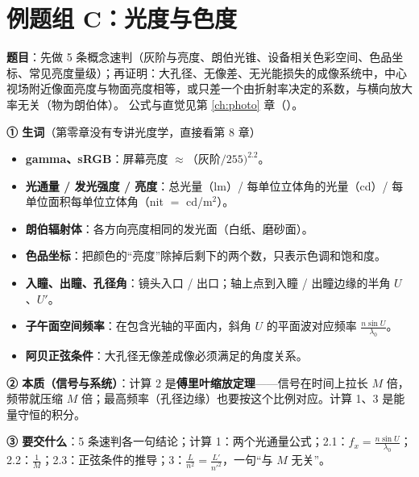 \section{例题组 C：光度与色度}\label{sec:exgC}
\noindent\textbf{题目}：先做 5 条概念速判（灰阶与亮度、朗伯光锥、设备相关色彩空间、色品坐标、常见亮度量级）；再证明：大孔径、无像差、无光能损失的成像系统中，中心视场附近像面亮度与物面亮度相等，或只差一个由折射率决定的系数，与横向放大率无关（物为朗伯体）。
公式与直觉见第 \ref{ch:photo} 章（\pageref{ch:photo}）。

\label{rd:exgC}
\begin{idea}[读题：概念与要交什么]
\textbf{① 生词}（第零章没有专讲光度学，直接看第 8 章）
\begin{itemize}
\item \textbf{gamma、sRGB}：屏幕亮度 $\approx$（灰阶$/255)^{2.2}$。
\item \textbf{光通量 / 发光强度 / 亮度}：总光量（lm）/ 每单位立体角的光量（cd）/ 每单位面积每单位立体角（nit $=$ cd/m$^2$）。
\item \textbf{朗伯辐射体}：各方向亮度相同的发光面（白纸、磨砂面）。
\item \textbf{色品坐标}：把颜色的“亮度”除掉后剩下的两个数，只表示色调和饱和度。
\item \textbf{入瞳、出瞳、孔径角}：镜头入口 / 出口；轴上点到入瞳 / 出瞳边缘的半角 $U$、$U'$。
\item \textbf{子午面空间频率}：在包含光轴的平面内，斜角 $U$ 的平面波对应频率 $\frac{n\sin U}{\lambda_0}$。
\item \textbf{阿贝正弦条件}：大孔径无像差成像必须满足的角度关系。
\end{itemize}
\textbf{② 本质（信号与系统）}：计算 2 是\textbf{傅里叶缩放定理}——信号在时间上拉长 $M$ 倍，频带就压缩 $M$ 倍；最高频率（孔径边缘）也要按这个比例对应。计算 1、3 是能量守恒的积分。

\textbf{③ 要交什么}：5 条速判各一句结论；计算 1：两个光通量公式；2.1：$f_x=\frac{n\sin U}{\lambda_0}$；2.2：$\frac1M$；2.3：正弦条件的推导；3：$\frac{L}{n^2}=\frac{L'}{n'^2}$，一句“与 $M$ 无关”。
\end{idea}


